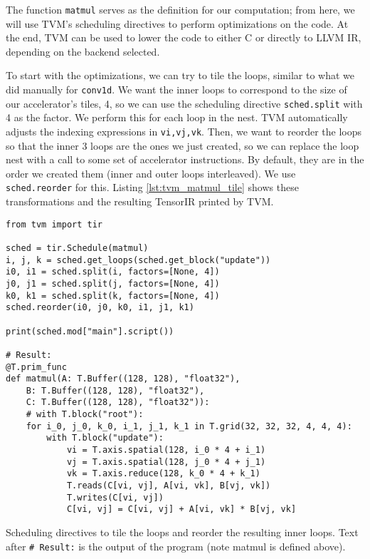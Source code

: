 \documentclass[acmsmall, nonacm=true]{acmart}
\begin{document}
The function \verb|matmul| serves as the definition for our computation; from here, we will use TVM's scheduling directives to perform optimizations on the code. At the end, TVM can be used to lower the code to either C or directly to LLVM IR, depending on the backend selected. 

To start with the optimizations, we can try to tile the loops, similar to what we did manually for \verb|conv1d|. We want the inner loops to correspond to the size of our accelerator's tiles, 4, so we can use the scheduling directive \verb|sched.split| with 4 as the factor. We perform this for each loop in the nest. TVM automatically adjusts the indexing expressions in \verb|vi,vj,vk|. Then, we want to reorder the loops so that the inner 3 loops are the ones we just created, so we can replace the loop nest with a call to some set of accelerator instructions. By default, they are in the order we created them (inner and outer loops interleaved). We use \verb|sched.reorder| for this. Listing \ref{lst:tvm_matmul_tile} shows these transformations and the resulting TensorIR printed by TVM.
\begin{listing}
    \centering
    \begin{verbatim}
from tvm import tir

sched = tir.Schedule(matmul)
i, j, k = sched.get_loops(sched.get_block("update"))
i0, i1 = sched.split(i, factors=[None, 4])
j0, j1 = sched.split(j, factors=[None, 4])
k0, k1 = sched.split(k, factors=[None, 4])
sched.reorder(i0, j0, k0, i1, j1, k1)

print(sched.mod["main"].script())

# Result: 
@T.prim_func
def matmul(A: T.Buffer((128, 128), "float32"),
    B: T.Buffer((128, 128), "float32"),
    C: T.Buffer((128, 128), "float32")):
    # with T.block("root"):
    for i_0, j_0, k_0, i_1, j_1, k_1 in T.grid(32, 32, 32, 4, 4, 4):
        with T.block("update"):
            vi = T.axis.spatial(128, i_0 * 4 + i_1)
            vj = T.axis.spatial(128, j_0 * 4 + j_1)
            vk = T.axis.reduce(128, k_0 * 4 + k_1)
            T.reads(C[vi, vj], A[vi, vk], B[vj, vk])
            T.writes(C[vi, vj])
            C[vi, vj] = C[vi, vj] + A[vi, vk] * B[vj, vk]
\end{verbatim}
\caption{Scheduling directives to tile the loops and reorder the resulting inner loops. Text after \texttt{\# Result:} is the output of the program (note matmul is defined above).}
\label{lst:tvm_matmul_tile}
\end{listing}
\end{document}
